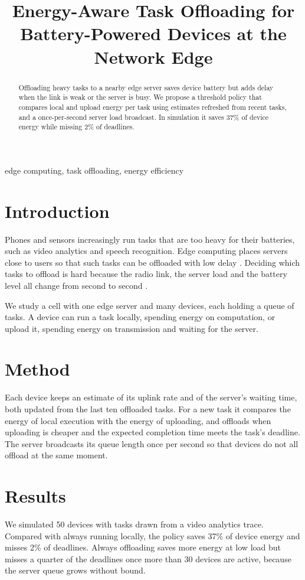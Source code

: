 \documentclass[conference]{IEEEtran}
\begin{document}
\title{Energy-Aware Task Offloading for Battery-Powered Devices at the Network Edge}
\author{}
\maketitle
\begin{abstract}
Offloading heavy tasks to a nearby edge server saves device battery but adds delay when the link is weak or the server is busy. We propose a threshold policy that compares local and upload energy per task using estimates refreshed from recent tasks, and a once-per-second server load broadcast. In simulation it saves 37\% of device energy while missing 2\% of deadlines.
\end{abstract}
\begin{IEEEkeywords}
edge computing, task offloading, energy efficiency
\end{IEEEkeywords}
\section{Introduction}
Phones and sensors increasingly run tasks that are too heavy for their batteries, such as video analytics and speech
recognition. Edge computing places servers close to users so that such tasks can be offloaded with low delay
\cite{shi}. Deciding which tasks to offload is hard because the radio link, the server load and the battery level all
change from second to second \cite{mao}.

We study a cell with one edge server and many devices, each holding a queue of tasks. A device can run a task locally,
spending energy on computation, or upload it, spending energy on transmission and waiting for the server.

\section{Method}
Each device keeps an estimate of its uplink rate and of the server's waiting time, both updated from the last ten
offloaded tasks. For a new task it compares the energy of local execution with the energy of uploading, and offloads
when uploading is cheaper and the expected completion time meets the task's deadline. The server broadcasts its queue
length once per second so that devices do not all offload at the same moment.

\section{Results}
We simulated 50 devices with tasks drawn from a video analytics trace. Compared with always running locally, the policy
saves 37\% of device energy and misses 2\% of deadlines. Always offloading saves more energy at low load but misses a
quarter of the deadlines once more than 30 devices are active, because the server queue grows without bound.
\end{document}
